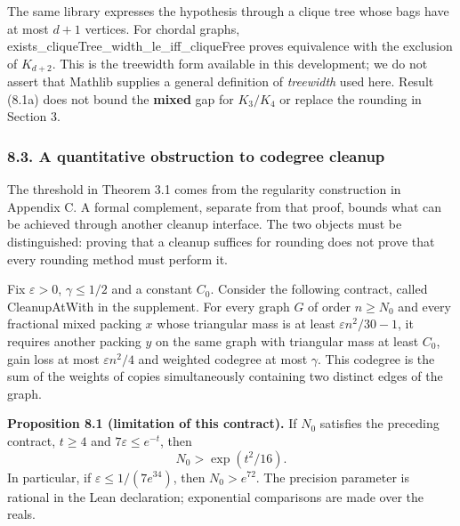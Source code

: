 \documentclass[english,11pt,a4paper]{article}
\begin{document}
The same library expresses the hypothesis through a clique tree whose bags have at most \(d+1\) vertices. For chordal graphs, {\ttfamily\small exists\_\discretionary{\hbox{\ensuremath{\hookrightarrow}}}{}{}cliqueTree\_\discretionary{\hbox{\ensuremath{\hookrightarrow}}}{}{}width\_\discretionary{\hbox{\ensuremath{\hookrightarrow}}}{}{}le\_\discretionary{\hbox{\ensuremath{\hookrightarrow}}}{}{}iff\_\discretionary{\hbox{\ensuremath{\hookrightarrow}}}{}{}cliqueFree} proves equivalence with the exclusion of \(K_{d+2}\). This is the treewidth form available in this development; we do not assert that Mathlib supplies a general definition of \emph{treewidth} used here. Result (8.1a) does not bound the \textbf{mixed} gap for \(K_3/K_4\) or replace the rounding in Section 3.

\subsubsection{8.3. A quantitative obstruction to codegree cleanup}\label{a-quantitative-obstruction-to-codegree-cleanup}

The threshold in Theorem 3.1 comes from the regularity construction in Appendix C. A formal complement, separate from that proof, bounds what can be achieved through another cleanup interface. The two objects must be distinguished: proving that a cleanup suffices for rounding does not prove that every rounding method must perform it.

Fix \(\varepsilon>0\), \(\gamma\le1/2\) and a constant \(C_0\). Consider the following contract, called {\ttfamily\small CleanupAtWit\discretionary{\hbox{\ensuremath{\hookrightarrow}}}{}{}h} in the supplement. For every graph \(G\) of order \(n\ge N_0\) and every fractional mixed packing \(x\) whose triangular mass is at least \(\varepsilon n^2/30-1\), it requires another packing \(y\) on the same graph with triangular mass at least \(C_0\), gain loss at most \(\varepsilon n^2/4\) and weighted codegree at most \(\gamma\). This codegree is the sum of the weights of copies simultaneously containing two distinct edges of the graph.


\textbf{Proposition 8.1 (limitation of this contract).} If \(N_0\) satisfies the preceding contract, \(t\ge4\) and \(7\varepsilon\le e^{-t}\), then \[
N_0>\exp(t^2/16).
\tag{8.2}
\] In particular, if \(\varepsilon\le1/(7e^{34})\), then \(N_0>e^{72}\). The precision parameter is rational in the Lean declaration; exponential comparisons are made over the reals.
\end{document}
